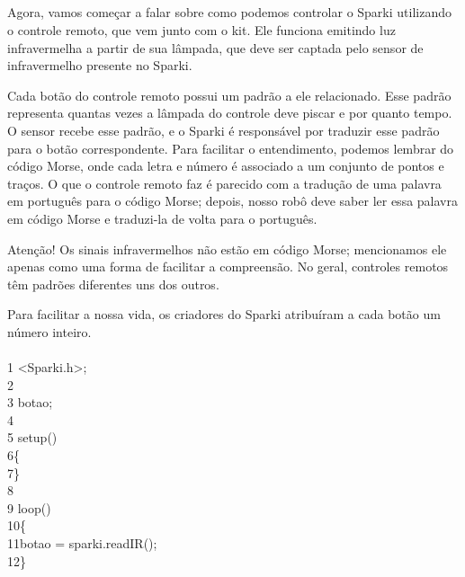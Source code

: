 \documentclass[conference]{IEEEtran}
\begin{document}
\begin{center}
    \subsection{}
\end{center}
\par
Agora, vamos começar a falar sobre como podemos controlar o Sparki utilizando o controle remoto, que vem junto com o kit. Ele funciona emitindo luz infravermelha a partir de sua lâmpada, que deve ser captada pelo sensor de infravermelho presente no Sparki.
\par
Cada botão do controle remoto possui um padrão a ele relacionado. Esse padrão representa quantas vezes a lâmpada do controle deve piscar e por quanto tempo. O sensor recebe esse padrão, e o Sparki é responsável por traduzir esse padrão para o botão correspondente. Para facilitar o entendimento, podemos lembrar do código Morse, onde cada letra e número é associado a um conjunto de pontos e traços. O que o controle remoto faz é parecido com a tradução de uma palavra em português para o código Morse; depois, nosso robô deve saber ler essa palavra em código Morse e traduzi-la de volta para o português.
\par
Atenção! Os sinais infravermelhos não estão em código Morse; mencionamos ele apenas como uma forma de facilitar a compreensão. No geral, controles remotos têm padrões diferentes uns dos outros.
\par
Para facilitar a nossa vida, os criadores do Sparki atribuíram a cada botão um número inteiro.
\\
\\
{\selectfont
    {\color{gray}1} <Sparki.h>;\\
    {\color{gray}2}\\
    {\color{gray}3} botao;\\
    {\color{gray}4}\\
    {\color{gray}5} setup()\\
    {\color{gray}6}\quad\{\\
    {\color{gray}7}\quad\}\\
    {\color{gray}8}\\
    {\color{gray}9} loop()\\
    {\color{gray}10}\quad\{\\
    {\color{gray}11}\quad\quad botao = sparki.readIR();\\
    {\color{gray}12}\quad\}}\
\end{document}
